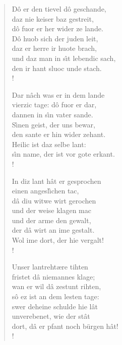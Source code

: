 \documentclass[11pt]{article}
\begin{document}
\begin{verse}
\begin{multicols}{2}
%
\begin{stanza}
D\^o er den tievel d\^o geschande,\\
daz nie keiser baz gestreit,\\
d\^o fuor er her wider ze lande.\\
D\^o huob sich der juden leit,\\
daz er herre ir huote brach,\\
und daz man in s\^\i t lebendic sach,\\
den ir hant sluoc unde stach.\\!
\end{stanza} 
%
%
\begin{stanza}
Dar n\^ach was er in dem lande\\
vierzic tage: d\^o fuor er dar,\\
dannen in s\^\i n vater sande.\\
S\^\i nen geist, der uns bewar,\\
den sante er hin wider zehant.\\
Heilic ist daz selbe lant:\\
s\^\i n name, der ist vor gote erkant.\\!
\end{stanza} 
%
%
\begin{stanza}
In diz lant h\^at er gesprochen\\
einen angesl\^\i chen tac,\\
d\^a diu witwe wirt gerochen\\
und der weise klagen mac\\
und der arme den gewalt,\\
der d\^a wirt an ime gestalt.\\
Wol ime dort, der hie vergalt!\\!
\end{stanza} 
%
%
\begin{stanza}
Unser lantreht\ae re tihten\\
fristet d\^a niemannes klage;\\
wan er wil d\^a zestunt rihten,\\
s\^o ez ist an dem lesten tage:\\
swer deheine schulde hie l\^at\\
unverebenet, wie der st\^at\\
dort, d\^a er pfant noch b\"urgen h\^at!\\!
\end{stanza} 
%
%
\begin{stanza}

\end{stanza}
\end{multicols}
\end{verse}
\end{document}

